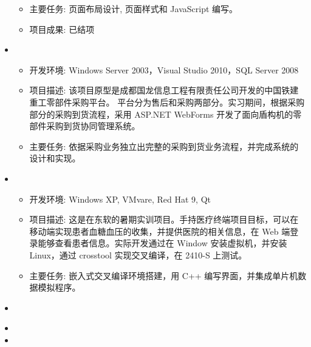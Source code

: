 \documentclass[letterpaper,11pt]{article}
\begin{document}
\begin{itemize}[leftmargin=*]
{\begin{itemize}
      \item 主要任务: 页面布局设计, 页面样式和 JavaScript 编写。
      \item 项目成果: 已结项
    \end{itemize}
    }
    \item
    {\footnotesize
    \begin{itemize}
      \item 开发环境: Windows Server 2003，Visual Studio 2010，SQL Server 2008
      \item 项目描述: 该项目原型是成都国龙信息工程有限责任公司开发的中国铁建重工零部件采购平台。 平台分为售后和采购两部分。实习期间，根据采购部分的采购到货流程，采用 ASP.NET WebForms 开发了面向盾构机的零部件采购到货协同管理系统。
      \item 主要任务: 依据采购业务独立出完整的采购到货业务流程，并完成系统的设计和实现。
    \end{itemize}
    }
    \item {}
    {\footnotesize
    \begin{itemize}
      \item 开发环境: Windows XP, VMvare, Red Hat 9, Qt
      \item 项目描述: 这是在东软的暑期实训项目。手持医疗终端项目目标，可以在移动端实现患者血糖血压的收集，并提供医院的相关信息，在 Web 端登录能够查看患者信息。实际开发通过在 Window 安装虚拟机，并安装 Linux，通过 crosstool 实现交叉编译，在 2410-S 上测试。
      \item 主要任务: 嵌入式交叉编译环境搭建，用 C++ 编写界面，并集成单片机数据模拟程序。
    \end{itemize}
    }
  \end{itemize}

  \begin{itemize}[leftmargin=*]
    \item
  \end{itemize}

  \begin{itemize}[leftmargin=*]
    \item
    \item
  \end{itemize}
\end{document}
